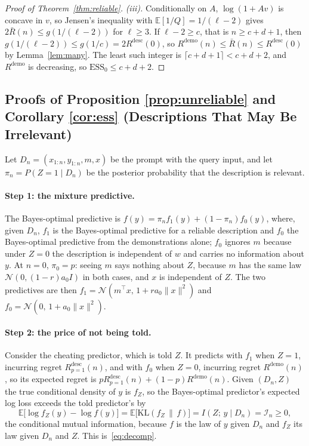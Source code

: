 \documentclass{article}
\newcommand{\ess}{\mathrm{ESS}}
\newcommand{\E}{\mathbb{E}}
\begin{document}
\begin{proof}[Proof of Theorem~\ref{thm:reliable}]
\emph{(iii).} Conditionally on $A$, $\log(1 + Av)$ is concave in $v$, so Jensen's inequality with $\E[1/Q] = 1/(\ell-2)$ gives $2\bar R(n) \le g(1/(\ell-2))$ for $\ell \ge 3$. If $\ell - 2 \ge c$, that is $n \ge c + d + 1$, then $g(1/(\ell-2)) \le g(1/c) = 2R^{\mathrm{desc}}(0)$, so $R^{\mathrm{demo}}(n) \le \bar R(n) \le R^{\mathrm{desc}}(0)$ by Lemma~\ref{lem:many}. The least such integer is $\lceil c + d + 1 \rceil < c + d + 2$, and $R^{\mathrm{demo}}$ is decreasing, so $\ess_0 \le c + d + 2$.
\end{proof}

\subsection{Proofs of Proposition \ref{prop:unreliable} and Corollary \ref{cor:ess} (Descriptions That May Be Irrelevant)}\label{app:reliability}
Let $D_n = (x_{1:n}, y_{1:n}, m, x)$ be the prompt with the query input, and let $\pi_n = P(Z = 1 \mid D_n)$ be the posterior probability that the description is relevant.

\paragraph{Step 1: the mixture predictive.}
The Bayes-optimal predictive is $f(y) = \pi_n f_1(y) + (1 - \pi_n) f_0(y)$, where, given $D_n$, $f_1$ is the Bayes-optimal predictive for a reliable description and $f_0$ the Bayes-optimal predictive from the demonstrations alone; $f_0$ ignores $m$ because under $Z = 0$ the description is independent of $w$ and carries no information about $y$. At $n = 0$, $\pi_0 = p$: seeing $m$ says nothing about $Z$, because $m$ has the same law $\mathcal{N}(0, (1-r) a_0 I)$ in both cases, and $x$ is independent of $Z$. The two predictives are then $f_1 = \mathcal{N}(m^\top x,\, 1 + r a_0\|x\|^2)$ and $f_0 = \mathcal{N}(0,\, 1 + a_0\|x\|^2)$.

\paragraph{Step 2: the price of not being told.}
Consider the cheating predictor, which is told $Z$. It predicts with $f_1$ when $Z=1$, incurring regret $R^{\mathrm{desc}}_{p=1}(n)$, and with $f_0$ when $Z=0$, incurring regret $R^{\mathrm{demo}}(n)$, so its expected regret is $p R^{\mathrm{desc}}_{p=1}(n) + (1-p) R^{\mathrm{demo}}(n)$. Given $(D_n, Z)$ the true conditional density of $y$ is $f_Z$, so the Bayes-optimal predictor's expected log loss exceeds the told predictor's by
\[
\E\big[\log f_Z(y) - \log f(y)\big] = \E\big[\mathrm{KL}(f_Z \,\|\, f)\big] = I(Z;\, y \mid D_n) = \mathcal{I}_n \ge 0,
\]
the conditional mutual information, because $f$ is the law of $y$ given $D_n$ and $f_Z$ its law given $D_n$ and $Z$. This is~\eqref{eq:decomp}.
\end{document}

